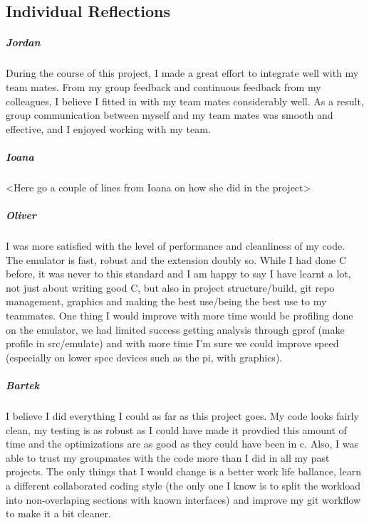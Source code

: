 \documentclass[11pt]{article}
\begin{document}
\subsection*{Individual Reflections}
\subparagraph*{Jordan}
During the course of this project, I made a great effort to integrate well with my team mates. From my group feedback and continuous feedback from my colleagues, I believe I fitted in with my team mates considerably well. As a result, group communication between myself and my team mates was smooth and effective, and I enjoyed working with my team.
\subparagraph*{Ioana}
<Here go a couple of lines from Ioana on how she did in the project>
\subparagraph*{Oliver}
I was more satisfied with the level of performance and cleanliness of my code. The emulator is fast, robust and the extension doubly so. While I had done C before, it was never to this standard and I am happy to say I have learnt a lot, not just about writing good C, but also in project structure/build, git repo management, graphics and making the best use/being the best use to my teammates. One thing I would improve with more time would be profiling done on the emulator, we had limited success getting analysis through gprof (make profile in src/emulate) and with more time I'm sure we could improve speed (especially on lower spec devices such as the pi, with graphics).
\subparagraph*{Bartek}
I believe I did everything I could as far as this project goes. My code looks fairly clean, my testing is as robust as I could have made it provdied this amount of time and the optimizations are as good as they could have been in c. Also, I was able to trust my groupmates with the code more than I did in all my past projects. The only things that I would change is a better work life ballance, learn a different collaborated coding style (the only one I know is to split the workload into non-overlaping sections with known interfaces) and improve my git workflow to make it a bit cleaner.
\end{document}
